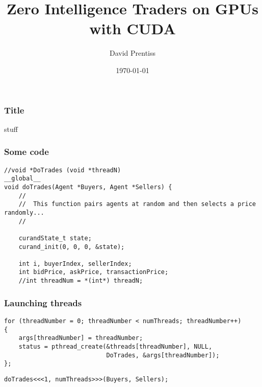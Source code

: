\documentclass{beamer}
\begin{document}
\title{Zero Intelligence Traders on GPUs with CUDA}
\author{David Prentiss}
\date{\today}


\frame{\titlepage}

\begin{frame}
  \frametitle{Title}
  stuff
\end{frame}

\begin{frame}[fragile]
  \frametitle{Some code}
\begin{lstlisting}
//void *DoTrades (void *threadN)
__global__
void doTrades(Agent *Buyers, Agent *Sellers) {
    //
    //	This function pairs agents at random and then selects a price randomly...
    //

    curandState_t state;
    curand_init(0, 0, 0, &state);

    int i, buyerIndex, sellerIndex;
    int bidPrice, askPrice, transactionPrice;
    //int threadNum = *(int*) threadN;
\end{lstlisting}
\end{frame}

\begin{frame}[fragile]
  \frametitle{Launching threads}
\begin{lstlisting}
for (threadNumber = 0; threadNumber < numThreads; threadNumber++)
{
    args[threadNumber] = threadNumber;
    status = pthread_create(&threads[threadNumber], NULL,
                            DoTrades, &args[threadNumber]);
};
\end{lstlisting}

\begin{lstlisting}
doTrades<<<1, numThreads>>>(Buyers, Sellers);
\end{lstlisting}
\end{frame}
\end{document}
